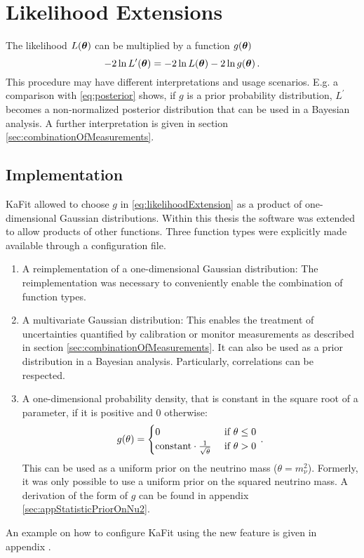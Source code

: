\section{Likelihood Extensions}
The likelihood $L(\boldsymbol{\mathbf{\theta}})$ can be multiplied by a function $g(\boldsymbol{\mathbf{\theta}})$
\begin{equation}
	\label{eq:likelihoodExtension}
	-2\ln L^\prime(\boldsymbol{\mathbf{\theta}}) = -2\ln L(\boldsymbol{\mathbf{\theta}}) -2\ln g(\boldsymbol{\mathbf{\theta}})
	\text{\,.}
\end{equation}
This procedure may have different interpretations and usage scenarios. E.g. a comparison with \eqref{eq:posterior} shows, if $g$ is a prior probability distribution, $L^\prime$ becomes a non-normalized posterior distribution that can be used in a Bayesian analysis. A further interpretation is given in section \ref{sec:combinationOfMeasurements}. 

\subsection{Implementation}
\label{sec:statLikelihoodExtImpl}
KaFit allowed to choose $g$ in \ref{eq:likelihoodExtension} as a product of one-dimensional Gaussian distributions. Within this thesis the software was extended to allow products of other functions. Three function types were explicitly made available through a configuration file.
\begin{enumerate}
	\item A reimplementation of a one-dimensional Gaussian distribution: The reimplementation was necessary to conveniently enable the combination of function types.
	\item A multivariate Gaussian distribution: This enables the treatment of uncertainties quantified by calibration or monitor measurements as described in section \ref{sec:combinationOfMeasurements}. It can also be used as a prior distribution in a Bayesian analysis. Particularly, correlations can be respected.
	\item A one-dimensional probability density, that is constant in the square root of a parameter, if it is positive and 0 otherwise:
	\begin{equation}
		g(\theta) =
		\begin{cases}
		0 &\text{ if } \theta \leq 0 \\
		\text{constant} \cdot \frac{1}{\sqrt{\theta}} &\text{ if } \theta > 0
		\end{cases}
		\text{\,.}
	\end{equation}
	 This can be used as a uniform prior on the neutrino mass ($\theta=m_\nu^2$). Formerly, it was only possible to use a uniform prior on the squared neutrino mass. A derivation of the form of $g$ can be found in appendix \ref{sec:appStatisticPriorOnNu2}.
\end{enumerate}
An example on how to configure KaFit using the new feature is given in appendix .

